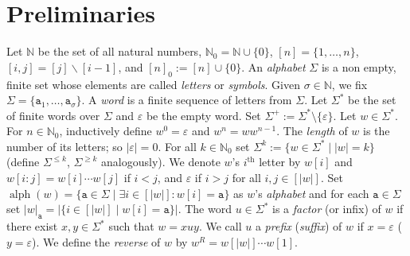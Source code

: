 \documentclass[runningheads,UKenglish,cleveref, autoref, thm-restate]{llncs}
\newcommand{\N}{\mathbb{N}}
\def\ta{\mathtt{a}}
\def\tb{\mathtt{b}}
\renewcommand{\epsilon}{\varepsilon}
\DeclareMathOperator{\letters}{alph}
\DeclareMathOperator{\Pref}{Pref}
\def\nth#1{#1$^{\text{th}}$}
\begin{document}


	
	
	\section{Preliminaries}\label{sec:prelims}
Let $\mathbb{N}$ be the set of all natural numbers, $\mathbb{N}_0 = \mathbb{N} \cup \{0\}$, 
$[n] = \{1,\ldots,n\}$, $[i,j]=[j]\backslash[i-1]$, and $[n]_0 := [n] \cup \{0\}$. An \emph{alphabet} 
$\Sigma$ is a non empty, finite set whose elements are called \emph{letters} or {\em symbols}.
Given $\sigma\in\N$, we fix  $\Sigma=\{\ta_1,\ldots,\ta_{\sigma}\}$.  A \emph{word} is a 
finite sequence of letters from $\Sigma$. Let $\Sigma^*$ be 
the set of finite words over $\Sigma$ and $\epsilon$ be the empty word. %
Set $\Sigma^+ := \Sigma^* \setminus \{\epsilon\}$. Let $w\in\Sigma^{\ast}$. 
For $n\in\N_0$, inductively define 
$w^0=\varepsilon$ and $w^n=ww^{n-1}$. 
The {\em length} of $w$ is the number of its letters; so $|\epsilon| = 0$. 
For all $k \in \mathbb{N}_0$ set $\Sigma^k := \{w \in \Sigma^* \mid |w| = k\}$ (define $\Sigma^{\leq k}$, $\Sigma^{\geq k}$ analogously). We denote $w$'s \nth{$i$} letter by $w[i]$ 
and $w[i:j]=w[i]\cdots w[j]$ if $i < j$,  and $\epsilon$ if $ i > j$ for all $i,j \in [\vert w \vert]$. 
Set $\letters(w) = \{\ta \in \Sigma \mid \exists i \in [|w|]: w[i] = \ta \}$ as $w$'s {\em alphabet} and 
for each $\ta \in \Sigma$ set $|w|_{\ta} = |\{i \in [|w|] \mid w[i]=\ta \}|$. The word $u \in 
\Sigma^*$ is a \emph{factor} (or infix) of $w$ if there exist $x,y \in \Sigma^*$ such that $w = xuy$.
We call $u$ a \emph{prefix} (\emph{suffix}) of $w$ if $x=\epsilon$ ($y = \epsilon$). 
We define the \emph{reverse} of $w$ by $w^R = w[|w|]\cdots w[1]$.
\end{document}
